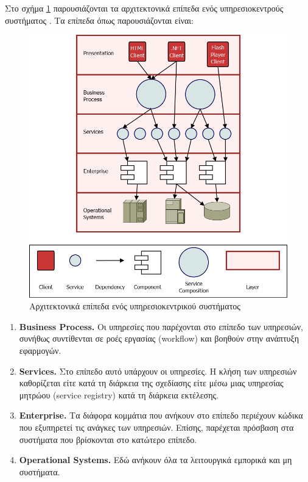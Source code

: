 Στο σχήμα \ref{fig:SOA_layers} παρουσιάζονται τα αρχιτεκτονικά επίπεδα ενός 
υπηρεσιοκεντρούς συστήματος \citep{Bianco2011}. Τα επίπεδα όπως παρουσιάζονται είναι:

\begin{figure}[htbp]
  \begin{center}
    \includegraphics[scale=0.3]{Figures/SOA/SOA_layers.png}
  \end{center}
  \caption{Αρχιτεκτονικά επίπεδα ενός υπηρεσιοκεντρικού συστήματος}
  \label{fig:SOA_layers}
\end{figure}

\begin{enumerate}
\setcounter{enumi}{\thenumberedCntF}
\item \textbf{Business Process.} Οι υπηρεσίες που παρέχονται στο 
επίπεδο των υπηρεσιών, συνήθως συντίθενται σε ροές εργασίας (workflow) 
και βοηθούν στην ανάπτυξη εφαρμογών.
\item \textbf{Services.} Στο επίπεδο αυτό υπάρχουν οι υπηρεσίες. Η 
κλήση των υπηρεσιών καθορίζεται είτε κατά τη διάρκεια της σχεδίασης είτε 
μέσω μιας υπηρεσίας μητρώου (service registry) κατά τη διάρκεια 
εκτέλεσης.
\item \textbf{Enterprise.} Τα διάφορα κομμάτια που ανήκουν στο επίπεδο 
περιέχουν κώδικα που εξυπηρετεί τις ανάγκες των υπηρεσιών. Επίσης, 
παρέχεται πρόσβαση στα συστήματα που βρίσκονται στο κατώτερο επίπεδο.
\item \textbf{Operational Systems.} Εδώ ανήκουν όλα τα λειτουργικά 
εμπορικά και μη συστήματα.
\setcounter{numberedCntF}{\theenumi}
\end{enumerate}

